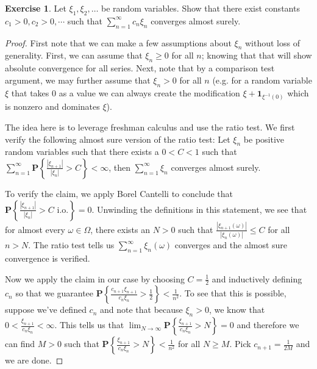 \documentclass{amsbook}
\theoremstyle{definition}
\newtheorem{xca}{Exercise}
\theoremstyle{remark}
\newcommand{\probability}[1]{\textbf{P}\left \{#1 \right \}}
\newcommand{\characteristic}[1]{\textbf{1}_{#1}}
\newcommand{\abs}[1]{\left \vert #1 \right \vert}
\begin{document}
\begin{xca}Let $\xi_1, \xi_2, \dots$ be random variables.  Show that
  there exist constants $c_1 > 0, c_2 >0, \cdots$ such that
  $\sum_{n=1}^\infty c_n \xi_n$ converges almost surely.
\end{xca}
\begin{proof}First note that we can make a few assumptions about $\xi_n$ without
loss of generality.  First, we can assume that $\xi_n \geq 0$ for all
$n$; knowing that that will show absolute convergence for all series.  Next,
note that by a comparison test argument, we may further assume that $\xi_n >
0$ for all $n$ (e.g. for a random variable $\xi$ that takes $0$ as a value we can
always create the modification $\xi + \characteristic{\xi^{-1}(0)}$
which is nonzero and dominates $\xi$).  

The idea here is to leverage freshman calculus and use the ratio
test.  We first verify the following almost sure version of the ratio
test: Let $\xi_n$ be positive random variables such that there exists
a $0 < C < 1$ such that
$\sum_{n=1}^\infty \probability{\frac{\abs{\xi_{n+1}}}{\abs{\xi_n}} >
  C} < \infty$, then $\sum_{n=1}^\infty \xi_n$ converges almost
surely.

To verify the claim, we apply Borel Cantelli to conclude that $\probability{\frac{\abs{\xi_{n+1}}}{\abs{\xi_n}} >
  C \text{ i.o.}} = 0$.  Unwinding the definitions in this statement, we see that for
almost every $\omega \in \Omega$, there exists an $N>0$ such that
$\frac{\abs{\xi_{n+1}(\omega)}}{\abs{\xi_n(\omega)}} \leq C$
for all $n > N$.  The ratio test tells us $\sum_{n=1}^\infty
\xi_n(\omega)$  converges and the almost sure convergence is verified.

Now we apply the claim in our case by choosing $C=\frac{1}{2}$ and inductively defining $c_n$ so
that we guarantee $\probability{\frac{c_{n+1} \xi_{n+1}}{c_n \xi_n} >
  \frac{1}{2}} < \frac{1}{n^2}$.  To see that this is possible,
suppose we've defined $c_n$ and note that because $\xi_n > 0$, we know
that $0 < \frac{\xi_{n+1}}{c_n \xi_n} < \infty$.  This tells us that
$\lim_{N \to \infty} \probability{\frac{\xi_{n+1}}{c_n \xi_n} > N} =0$
and therefore we can find $M>0$ such that
$\probability{\frac{\xi_{n+1}}{c_n \xi_n} > N} < \frac{1}{n^2}$ for
all $N\geq M$.  Pick $c_{n+1} = \frac{1}{2M}$ and we are done.


\end{proof}
\end{document}
